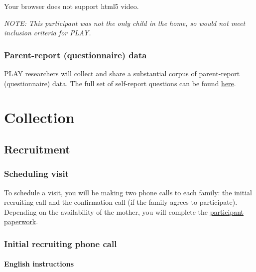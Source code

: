\documentclass[
  12pt,
]{book}
\begin{document}
Your browser does not support html5 video.

\emph{NOTE: This participant was not the only child in the home, so would not meet inclusion criteria for PLAY.}

\hypertarget{parent-report-questionnaire-data}{%
\section{Parent-report (questionnaire) data}\label{parent-report-questionnaire-data}}

PLAY researchers will collect and share a substantial corpus of parent-report (questionnaire) data. The full set of self-report questions can be found \href{collection_homevisit_questionnaires.html}{here}.

\hypertarget{part-collection}{%
\part*{Collection}\label{part-collection}}

\hypertarget{recruitment}{%
\chapter{Recruitment}\label{recruitment}}

\hypertarget{scheduling}{%
\section{Scheduling visit}\label{scheduling}}

To schedule a visit, you will be making two phone calls to each family: the initial recruiting call and the confirmation call (if the family agrees to participate). Depending on the availability of the mother, you will complete the \href{link\%20to\%20questionnaires}{participant paperwork}.

\hypertarget{initial-recruiting-phone-call}{%
\section{Initial recruiting phone call}\label{initial-recruiting-phone-call}}

\hypertarget{english_instructions}{%
\subsection*{English instructions}\label{english_instructions}}
\end{document}
